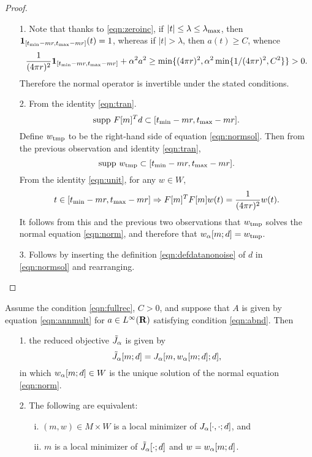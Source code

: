 \begin{proof} 
  \begin{itemize}
  \item[1. ]Note that thanks to \ref{eqn:zeroinc}, if $|t|\le
    \lambda \le \lambda_{\rm max}$, then ${\bf 1}_{[t_{\rm min}-mr,  
      t_{\rm max}-mr]}(t) = 1$, whereas if $|t|>\lambda$,
    then $a(t) \ge C$, whence
    \[
      \frac{1}{(4\pi r)^2}  {\bf 1}_{[t_{\rm min}-mr,  
        t_{\rm max}-mr]} + \alpha^2a^2  \ge \min\{(4\pi r)^2,
      \alpha^2\min\{1/(4\pi r)^2,C^2\} \}> 0.
    \]
    Therefore the normal operator is invertible under the stated
    conditions.

  \item[2. ]From the identity \ref{eqn:tran}.
    \[
      \mbox{supp }F[m]^Td \subset [t_{\rm min}-mr,t_{\rm max}-mr].
    \]
    Define $w_{\rm tmp}$ to be the right-hand side of equation \ref{eqn:normsol}. Then
    from the previous observation and identity \ref{eqn:tran},
    \[
      \mbox{supp }w_{\rm tmp} \subset [t_{\rm min}-mr,t_{\rm max}-mr].
    \]
    From the identity \ref{eqn:unit}, for any $w \in W$,
    \[
      t \in [t_{\rm min}-mr,t_{\rm max}-mr] \Rightarrow F[m]^TF[m]w(t)
      = \frac{1}{(4 \pi r)^2}w(t).
    \]
    It follows from this and the previous two observations that
    $w_{\rm tmp}$ solves the normal equation \ref{eqn:norm}, and
    therefore that $w_{\alpha}[m;d]=w_{\rm tmp}$.

  \item[3. ]Follows by inserting the definition
    \ref{eqn:defdatanonoise} of $d$ in \ref{eqn:normsol} and
    rearranging.
  \end{itemize}
\end{proof}

\begin{theorem}
  \label{thm:norminv}
  Assume the condition \ref{eqn:fullrec}, $C>0$, and suppose that $A$ is
  given by equation \ref{eqn:annmult} for $a \in L^{\infty}({\bf R})$
  satisfying condition \ref{eqn:abnd}.  Then
  \begin{itemize}
  \item[1. ]the reduced objective $\tilde{J}_{\alpha}$ is given by
    \begin{equation}
      \label{eqn:redexp1}
      \tilde{J}_{\alpha}[m;d] = J_{\alpha}[m,w_{\alpha}[m;d];d],
    \end{equation}
    in which $w_{\alpha}[m;d] \in W$ is the unique solution of the normal
    equation \ref{eqn:norm}.
  \item[2. ]The following are equivalent:
    \begin{itemize}
    \item[i. ]$(m,w) \in M \times W$ is a local minimizer of
      $J_{\alpha}[\cdot,\cdot;d]$, and
    \item[ii. ]$m$ is a local minimizer of $\tilde{J}_{\alpha}[\cdot;d]$ and
      $w=w_{\alpha}[m;d]$.
    \end{itemize}
  \end{itemize}
\end{theorem}

